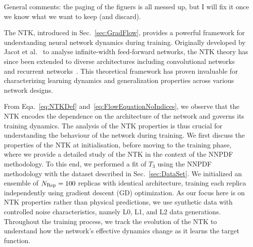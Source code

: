 \ac{General comments: the paging of the figuers is all messed up, but I will fix
it once we know what we want to keep (and discard).} 

The NTK, introduced in Sec.~\ref{sec:GradFlow}, provides a powerful framework for understanding neural
network dynamics during training. Originally developed by Jacot et
al.~\cite{jacot2018neural} to analyse infinite-width feed-forward networks, the
NTK theory has since been extended to diverse architectures including
convolutional networks~\cite{arora2019exact} and recurrent
networks~\cite{alemohammad2021recurrent}. This theoretical framework has proven
invaluable for characterizing learning dynamics and generalization properties
across various network designs.

From Eqa.~\eqref{eq:NTKDef} and~\eqref{eq:FlowEquationNoIndices}, we observe that the NTK encodes the
dependence on the architecture of the network and governs its training dynamics.
The analysis of the NTK properties is thus crucial for understanding the 
behaviour of the network during training. We first discuss the properties of the NTK at
initialisation, before moving to the training phase, where we provide a detailed
study of the NTK in the context of the NNPDF methodology. To this end, we
performed a fit of $T_3$ using the NNPDF methodology with the dataset described
in Sec.~\ref{sec:DataSet}. We initialized an ensemble of $N_{\rm Rep} = 100$ replicas with
identical architecture, training each replica independently using gradient
descent (GD) optimization. As our focus here is on NTK properties rather than
physical predictions, we use synthetic data with controlled noise
characteristics, namely L0, L1, and L2 data generations. Throughout the training process, 
we track the evolution of the NTK to understand how the network's effective
dynamics change as it learns the target function.

